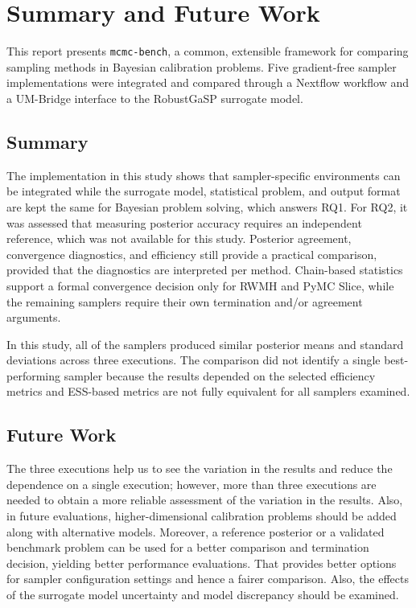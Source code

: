 \chapter{Summary and Future Work}
\label{ch:summary}

This report presents \texttt{mcmc-bench}, a common, extensible framework for comparing sampling methods in Bayesian calibration problems. Five gradient-free sampler implementations were integrated and compared through a Nextflow workflow and a UM-Bridge interface to the RobustGaSP surrogate model.

\section{Summary}
\label{sec:summary}

The implementation in this study shows that sampler-specific environments can be integrated while the surrogate model, statistical problem, and output format are kept the same for Bayesian problem solving, which answers RQ1. For RQ2, it was assessed that measuring posterior accuracy requires an independent reference, which was not available for this study. Posterior agreement, convergence diagnostics, and efficiency still provide a practical comparison, provided that the diagnostics are interpreted per method. Chain-based statistics support a formal convergence decision only for RWMH and PyMC Slice, while the remaining samplers require their own termination and/or agreement arguments.

In this study, all of the samplers produced similar posterior means and standard deviations across three executions. The comparison did not identify a single best-performing sampler because the results depended on the selected efficiency metrics and ESS-based metrics are not fully equivalent for all samplers examined.

\section{Future Work}
\label{sec:future-work}

The three executions help us to see the variation in the results and reduce the dependence on a single execution; however, more than three executions are needed to obtain a more reliable assessment of the variation in the results. Also, in future evaluations, higher-dimensional calibration problems should be added along with alternative models. Moreover, a reference posterior or a validated benchmark problem can be used for a better comparison and termination decision, yielding better performance evaluations. That provides better options for sampler configuration settings and hence a fairer comparison. Also, the effects of the surrogate model uncertainty and model discrepancy should be examined.

